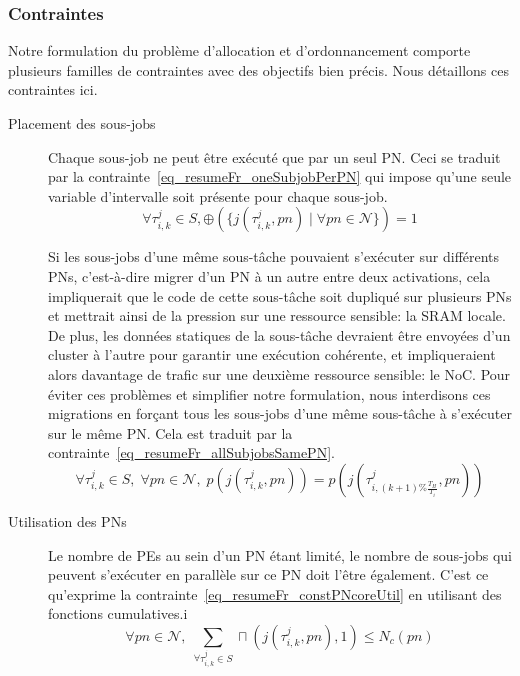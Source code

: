 \documentclass[main.tex]{subfiles}
\begin{document}
\subsubsection{Contraintes}
Notre formulation du problème d'allocation et d'ordonnancement comporte plusieurs familles de contraintes avec des objectifs bien précis. Nous détaillons ces contraintes ici.
\begin{description}
    \item[Placement des sous-jobs]
        Chaque sous-job ne peut être exécuté que par un seul PN. Ceci se traduit par la contrainte~\ref{eq_resumeFr_oneSubjobPerPN} qui impose qu'une seule variable d'intervalle soit présente pour chaque sous-job.
\begin{equation}
    \label{eq_resumeFr_oneSubjobPerPN}
    \forall \tau_{i,k}^j \in S ,  
    \oplus(\{ j( \tau_{i,k}^j , pn ) \; | \; \forall pn \in \mathcal{N}\})=1
\end{equation}

        Si les sous-jobs d'une même sous-tâche pouvaient s'exécuter sur différents PNs, c'est-à-dire migrer d'un PN à un autre entre deux activations, cela impliquerait que le code de cette sous-tâche soit dupliqué sur plusieurs PNs et mettrait ainsi de la pression sur une ressource sensible: la SRAM locale. De plus, les données statiques de la sous-tâche devraient être envoyées d'un cluster à l'autre pour garantir une exécution cohérente, et impliqueraient alors davantage de trafic sur une deuxième ressource sensible: le NoC. Pour éviter ces problèmes et simplifier notre formulation, nous interdisons ces migrations en forçant tous les sous-jobs d'une même sous-tâche à s'exécuter sur le même PN. Cela est traduit par la contrainte~\ref{eq_resumeFr_allSubjobsSamePN}.
\begin{equation}
    \label{eq_resumeFr_allSubjobsSamePN}
    \forall \tau_{i,k}^j \in S, \; \forall pn \in \mathcal{N}, \;
    p( j( \tau_{i,k}^j, pn )) = p( j( \tau_{i,(k+1) \% \frac{T_H}{T_i}}^j, pn ))
\end{equation}

    \item[Utilisation des PNs]
        Le nombre de PEs au sein d'un PN étant limité, le nombre de sous-jobs qui peuvent s'exécuter en parallèle sur ce PN doit l'être également. C'est ce qu'exprime la contrainte~\ref{eq_resumeFr_constPNcoreUtil} en utilisant des fonctions cumulatives.i
\begin{equation}
    \label{eq_resumeFr_constPNcoreUtil}
    \forall pn \in \mathcal{N} , \;
    \underset{\forall \tau_{i,k}^j \in S}{\sum} \sqcap( j( \tau_{i,k}^j , pn ),1) \leq N_c(pn)
\end{equation}


\end{description}
\end{document}
